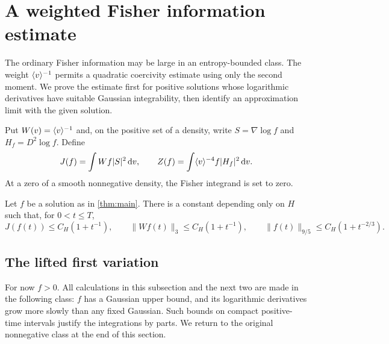 \section{A weighted Fisher information estimate}\label{sec:weighted}

The ordinary Fisher information may be large in an entropy-bounded class. The weight $\langle v\rangle^{-1}$ permits a quadratic coercivity estimate using only the second moment. We prove the estimate first for positive solutions whose logarithmic derivatives have suitable Gaussian integrability, then identify an approximation limit with the given solution.

Put $W(v)=\langle v\rangle^{-1}$ and, on the positive set of a density, write $S=\nabla\log f$ and $H_f=D^2\log f$. Define
\begin{equation}\label{eq:JZ}
 J(f)=\int Wf|S|^2\,\mathrm dv,\qquad
 Z(f)=\int\langle v\rangle^{-4}f|H_f|^2\,\mathrm dv.
\end{equation}
At a zero of a smooth nonnegative density, the Fisher integrand is set to zero.

\begin{proposition}\label{prop:weighted}
Let $f$ be a solution as in \cref{thm:main}. There is a constant depending only on $H$ such that, for $0<t\le T$,
\begin{equation}\label{eq:weighted-result}
 J(f(t))\le C_H(1+t^{-1}),\qquad
 \|Wf(t)\|_3\le C_H(1+t^{-1}),\qquad
 \|f(t)\|_{9/5}\le C_H(1+t^{-2/3}).
\end{equation}
\end{proposition}

\subsection{The lifted first variation}

For now $f>0$. All calculations in this subsection and the next two are made in the following class: $f$ has a Gaussian upper bound, and its logarithmic derivatives grow more slowly than any fixed Gaussian. Such bounds on compact positive-time intervals justify the integrations by parts. We return to the original nonnegative class at the end of this section.

